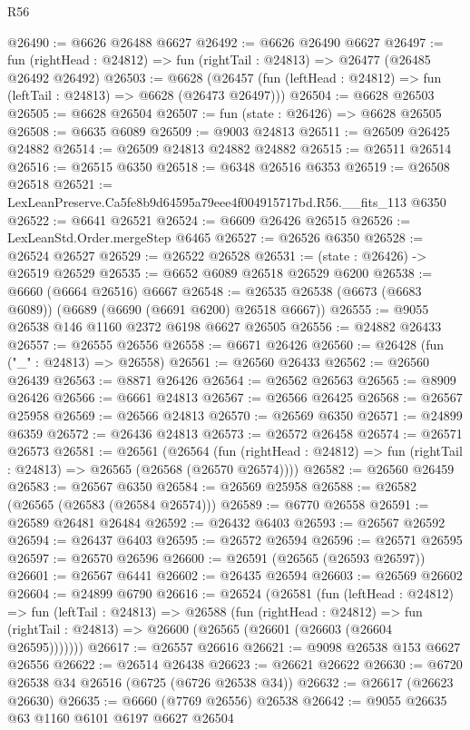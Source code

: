 \begin{lexlean}{R56}
\begin{coremodule}
@26490 := @6626 @26488 @6627
@26492 := @6626 @26490 @6627
@26497 := fun (rightHead : @24812) => fun (rightTail : @24813) => @26477 (@26485 @26492 @26492)
@26503 := @6628
    (@26457 (fun (leftHead : @24812) => fun (leftTail : @24813) => @6628 (@26473 @26497)))
@26504 := @6628 @26503
@26505 := @6628 @26504
@26507 := fun (state : @26426) => @6628 @26505
@26508 := @6635 @6089
@26509 := @9003 @24813
@26511 := @26509 @26425 @24882
@26514 := @26509 @24813 @24882 @24882
@26515 := @26511 @26514
@26516 := @26515 @6350
@26518 := @6348 @26516 @6353
@26519 := @26508 @26518
@26521 := LexLeanPreserve.Ca5fe8b9d64595a79eee4f004915717bd.R56.__fits_113 @6350
@26522 := @6641 @26521
@26524 := @6609 @26426 @26515
@26526 := LexLeanStd.Order.mergeStep @6465
@26527 := @26526 @6350
@26528 := @26524 @26527
@26529 := @26522 @26528
@26531 := (state : @26426) -> @26519 @26529
@26535 := @6652 @6089 @26518 @26529 @6200
@26538 := @6660 (@6664 @26516) @6667
@26548 := @26535 @26538 (@6673 (@6683 @6089)) (@6689 (@6690 (@6691 @6200) @26518 @6667))
@26555 := @9055 @26538 @146 @1160 @2372 @6198 @6627 @26505
@26556 := @24882 @26433
@26557 := @26555 @26556
@26558 := @6671 @26426
@26560 := @26428 (fun ("_" : @24813) => @26558)
@26561 := @26560 @26433
@26562 := @26560 @26439
@26563 := @8871 @26426
@26564 := @26562 @26563
@26565 := @8909 @26426
@26566 := @6661 @24813
@26567 := @26566 @26425
@26568 := @26567 @25958
@26569 := @26566 @24813
@26570 := @26569 @6350
@26571 := @24899 @6359
@26572 := @26436 @24813
@26573 := @26572 @26458
@26574 := @26571 @26573
@26581 := @26561
    (@26564
      (fun (rightHead : @24812) => fun (rightTail : @24813) => @26565 (@26568 (@26570 @26574))))
@26582 := @26560 @26459
@26583 := @26567 @6350
@26584 := @26569 @25958
@26588 := @26582 (@26565 (@26583 (@26584 @26574)))
@26589 := @6770 @26558
@26591 := @26589 @26481 @26484
@26592 := @26432 @6403
@26593 := @26567 @26592
@26594 := @26437 @6403
@26595 := @26572 @26594
@26596 := @26571 @26595
@26597 := @26570 @26596
@26600 := @26591 (@26565 (@26593 @26597))
@26601 := @26567 @6441
@26602 := @26435 @26594
@26603 := @26569 @26602
@26604 := @24899 @6790
@26616 := @26524
    (@26581
      (fun (leftHead : @24812) =>
      fun (leftTail : @24813) =>
      @26588
        (fun (rightHead : @24812) =>
        fun (rightTail : @24813) => @26600 (@26565 (@26601 (@26603 (@26604 @26595)))))))
@26617 := @26557 @26616
@26621 := @9098 @26538 @153 @6627 @26556
@26622 := @26514 @26438
@26623 := @26621 @26622
@26630 := @6720 @26538 @34 @26516 (@6725 (@6726 @26538 @34))
@26632 := @26617 (@26623 @26630)
@26635 := @6660 (@7769 @26556) @26538
@26642 := @9055 @26635 @63 @1160 @6101 @6197 @6627 @26504

\end{coremodule}
\end{lexlean}
